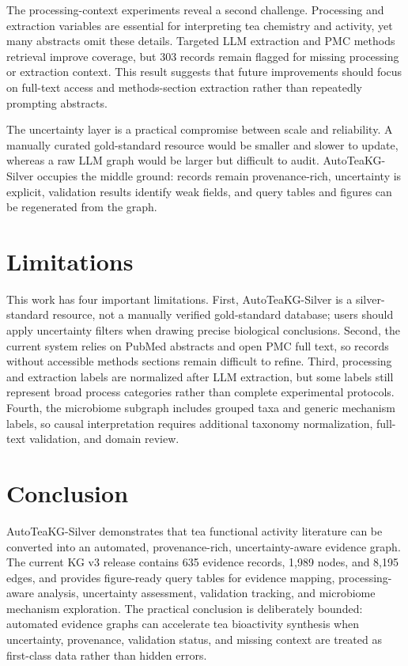 \documentclass[11pt]{article}
\begin{document}
The processing-context experiments reveal a second challenge. Processing and extraction variables are essential for interpreting tea chemistry and activity, yet many abstracts omit these details. Targeted LLM extraction and PMC methods retrieval improve coverage, but 303 records remain flagged for missing processing or extraction context. This result suggests that future improvements should focus on full-text access and methods-section extraction rather than repeatedly prompting abstracts.

The uncertainty layer is a practical compromise between scale and reliability. A manually curated gold-standard resource would be smaller and slower to update, whereas a raw LLM graph would be larger but difficult to audit. AutoTeaKG-Silver occupies the middle ground: records remain provenance-rich, uncertainty is explicit, validation results identify weak fields, and query tables and figures can be regenerated from the graph.

\section{Limitations}

This work has four important limitations. First, AutoTeaKG-Silver is a silver-standard resource, not a manually verified gold-standard database; users should apply uncertainty filters when drawing precise biological conclusions. Second, the current system relies on PubMed abstracts and open PMC full text, so records without accessible methods sections remain difficult to refine. Third, processing and extraction labels are normalized after LLM extraction, but some labels still represent broad process categories rather than complete experimental protocols. Fourth, the microbiome subgraph includes grouped taxa and generic mechanism labels, so causal interpretation requires additional taxonomy normalization, full-text validation, and domain review.

\section{Conclusion}

AutoTeaKG-Silver demonstrates that tea functional activity literature can be converted into an automated, provenance-rich, uncertainty-aware evidence graph. The current KG v3 release contains 635 evidence records, 1,989 nodes, and 8,195 edges, and provides figure-ready query tables for evidence mapping, processing-aware analysis, uncertainty assessment, validation tracking, and microbiome mechanism exploration. The practical conclusion is deliberately bounded: automated evidence graphs can accelerate tea bioactivity synthesis when uncertainty, provenance, validation status, and missing context are treated as first-class data rather than hidden errors.
\end{document}
